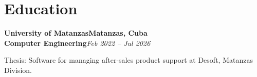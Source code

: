 \section{Education}

\vspace{5pt}
\textbf{University of Matanzas}\hfill\textbf{Matanzas, Cuba}\\
\textbf{Computer Engineering}\hfill\textit{Feb 2022 – Jul 2026}\par

Thesis: Software for managing after-sales product support at Desoft, Matanzas Division.
